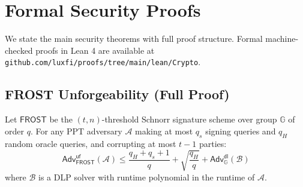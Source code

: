 \section{Formal Security Proofs}

\label{sec:proofs}

We state the main security theorems with full proof structure. Formal machine-checked
proofs in Lean 4 are available at
\texttt{github.com/luxfi/proofs/tree/main/lean/Crypto}.

\subsection{FROST Unforgeability (Full Proof)}

\begin{theorem}[FROST-UF]
\label{thm:frost-uf-full}
Let $\mathsf{FROST}$ be the $(t,n)$-threshold Schnorr signature scheme over group
$\mathbb{G}$ of order $q$. For any PPT adversary $\mathcal{A}$ making at most $q_s$
signing queries and $q_H$ random oracle queries, and corrupting at most $t-1$ parties:
\[
  \mathsf{Adv}^{\mathsf{uf}}_{\mathsf{FROST}}(\mathcal{A}) \leq
    \frac{q_H + q_s + 1}{q} + \sqrt{\frac{q_H}{q}} +
    \mathsf{Adv}^{\mathsf{dl}}_{\mathbb{G}}(\mathcal{B})
\]
where $\mathcal{B}$ is a DLP solver with runtime polynomial in the runtime of
$\mathcal{A}$.
\end{theorem}

